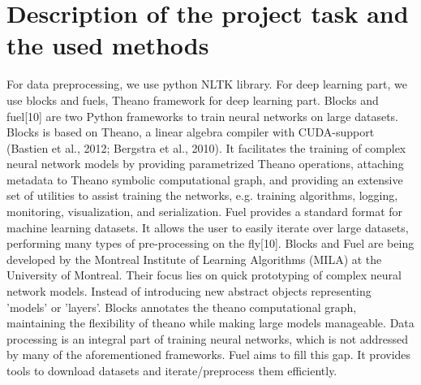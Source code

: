 \documentclass[runningheads,a4paper]{llncs}
\begin{document}
\section{Description of the project task and the used methods}
For data preprocessing, we use python NLTK library.
For deep learning part, we use blocks and fuels, Theano framework for deep learning part. 
Blocks and fuel[10] are two Python frameworks to train neural networks on large datasets. Blocks is based on Theano, a linear algebra compiler with CUDA-support (Bastien et al., 2012; Bergstra et al., 2010). It facilitates the training of complex neural network models by providing parametrized Theano operations, attaching metadata to Theano symbolic computational graph, and providing an extensive set of utilities to assist training the networks, e.g. training algorithms, logging, monitoring, visualization, and serialization. Fuel provides a standard format for machine learning datasets. It allows the user to easily iterate over large datasets, performing many types of pre-processing on the fly[10].
Blocks and Fuel are being developed by the Montreal Institute of Learning Algorithms (MILA) at the University of Montreal. Their focus lies on quick prototyping of complex neural network models. 
Instead of introducing new abstract objects representing 'models' or 'layers'. Blocks annotates the theano computational graph, maintaining the flexibility of theano while making large models manageable. 
Data processing is an integral part of training neural networks, which is not addressed by many of the aforementioned frameworks. Fuel aims to fill this gap. It provides tools to download datasets and iterate/preprocess them efficiently. 
\end{document}
